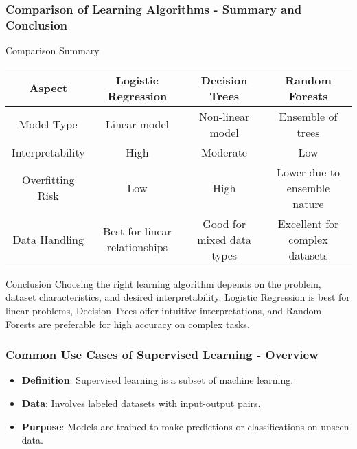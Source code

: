 \documentclass[aspectratio=169]{beamer}
\begin{document}
\begin{frame}[fragile]
    \frametitle{Comparison of Learning Algorithms - Summary and Conclusion}
    \begin{block}{Comparison Summary}
        \begin{center}
        \begin{tabular}{|c|c|c|c|}
            \hline
            \textbf{Aspect} & \textbf{Logistic Regression} & \textbf{Decision Trees} & \textbf{Random Forests} \\
            \hline
            Model Type & Linear model & Non-linear model & Ensemble of trees \\
            \hline
            Interpretability & High & Moderate & Low \\
            \hline
            Overfitting Risk & Low & High & Lower due to ensemble nature \\
            \hline
            Data Handling & Best for linear relationships & Good for mixed data types & Excellent for complex datasets \\
            \hline
        \end{tabular}
        \end{center}
    \end{block}
    \begin{block}{Conclusion}
        Choosing the right learning algorithm depends on the problem, dataset characteristics, and desired interpretability. 
        Logistic Regression is best for linear problems, Decision Trees offer intuitive interpretations, 
        and Random Forests are preferable for high accuracy on complex tasks.
    \end{block}
\end{frame}

\begin{frame}[fragile]
    \frametitle{Common Use Cases of Supervised Learning - Overview}
    \begin{itemize}
        \item \textbf{Definition}: Supervised learning is a subset of machine learning.
        \item \textbf{Data}: Involves labeled datasets with input-output pairs.
        \item \textbf{Purpose}: Models are trained to make predictions or classifications on unseen data.
    \end{itemize}
\end{frame}
\end{document}
